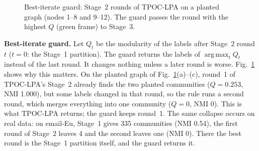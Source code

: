 \documentclass[conference]{IEEEtran}
\DeclareMathOperator*{\argmax}{arg\,max}
\begin{document}
\begin{figure}[b]
\caption{Best-iterate guard: Stage~2 rounds of TPOC-LPA on a planted graph (nodes 1--8 and 9--12). The guard passes the round with the highest $Q$ (green frame) to Stage~3.}
\label{fig:m2}
\end{figure}


\textbf{Best-iterate guard.} Let $Q_t$ be the modularity of the labels after Stage~2 round $t$ ($t=0$: the Stage~1 partition). The guard returns the labels of $\argmax_tQ_t$ instead of the last round. It changes nothing unless a later round is worse. Fig.~\ref{fig:m2} shows why this matters. On the planted graph of Fig.~\ref{fig:m2}(a)--(c), round~1 of TPOC-LPA's Stage~2 already finds the two planted communities ($Q=0.253$, NMI 1.000), but some labels changed in that round, so the rule runs a second round, which merges everything into one community ($Q=0$, NMI 0). This is what TPOC-LPA returns; the guard keeps round~1. The same collapse occurs on real data: on email-Eu, Stage~1 gives 335 communities (NMI 0.54), the first round of Stage~2 leaves 4 and the second leaves one (NMI 0). There the best round is the Stage~1 partition itself, and the guard returns it.
\end{document}
